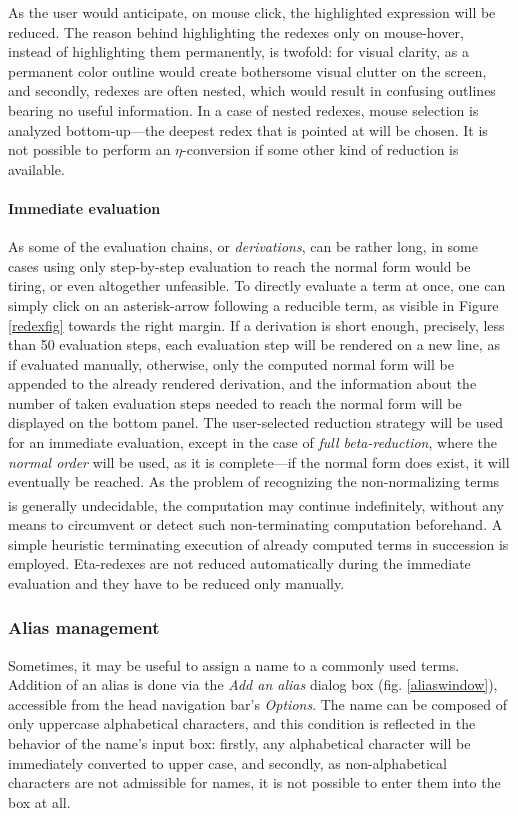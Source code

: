 \documentclass[table, a4paper, 10pt]{article}
\newcommand{\cit}[1]{\textsuperscript{\cite{#1}}}
\begin{document}
As the user would anticipate, on mouse click, the highlighted expression will be reduced.
The reason behind highlighting the redexes only on mouse-hover, instead of highlighting
them permanently, is twofold: for visual clarity, as a permanent color outline would
create bothersome visual clutter on the screen, and secondly, redexes are
often nested, which would result in confusing outlines bearing no useful information.
In a case of nested redexes, mouse selection is analyzed bottom-up---the deepest 
redex that is pointed at will be chosen. It is not possible to
perform an $\eta$-conversion if some other kind of reduction is available.

\paragraph{Immediate evaluation}
As some of the evaluation chains, or \textit{derivations},
can be rather long, in some cases using
only step-by-step evaluation to reach the normal form would be tiring, or even altogether unfeasible.
To directly evaluate a term at once, one can simply click on an asterisk-arrow following
a reducible term, as visible in Figure \ref{redexfig} towards the right margin.
If a derivation is short enough, precisely, less than 50 evaluation steps,
each evaluation step will be rendered on a new line, as if evaluated manually,
otherwise, only the computed normal form
will be appended to the already rendered derivation, and the information
about the number of taken evaluation steps needed to reach the normal form will be
displayed on the bottom panel. The user-selected reduction strategy 
will be used for an immediate evaluation, except in the case of \textit{full beta-reduction}, where the
\textit{normal order} will be used, as it is complete---if the normal form does
exist, it will eventually be reached.
As the problem of recognizing the non-normalizing terms is generally undecidable,\cit{zlatuska}
the computation may continue indefinitely, without any means
to circumvent or detect such non-terminating computation beforehand.
A simple heuristic terminating execution
of already computed terms in succession is employed.
Eta-redexes are not reduced automatically during the immediate evaluation and they
have to be reduced only manually.

\subsubsection{Alias management}
Sometimes, it may be useful to assign a name to a commonly used terms. 
Addition of an alias is done via the \textit{Add an alias} dialog box (fig. \ref{aliaswindow}),
accessible from the head navigation bar's \textit{Options}.
The name can be composed of only uppercase alphabetical characters,
and this condition is
reflected in the behavior of the name's input box: firstly, any alphabetical character
will be immediately converted to upper case, and secondly, as non-alphabetical characters
are not admissible for names, it is not possible to enter them into the box at all.
\end{document}
